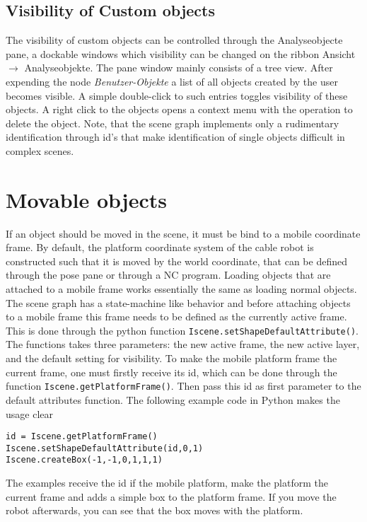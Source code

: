 \documentclass[11pt,a4paper,onepage,openany]{book}
\begin{document}
\subsection{Visibility of Custom objects}
The visibility of custom objects can be controlled through the Analyseobjecte
pane, a dockable windows which visibility can be changed on the ribbon
Ansicht $\rightarrow$ Analyseobjekte. The pane window mainly consists of a
tree view. After expending the node \emph{Benutzer-Objekte} a list of all
objects created by the user becomes visible. A simple double-click to such
entries toggles visibility of these objects. A right click to the objects
opens a context menu with the operation to delete the object. Note, that the
scene graph implements only a rudimentary identification through id's that
make identification of single objects difficult in complex scenes.

\section{Movable objects}
If an object should be moved in the scene, it must be bind to a mobile
coordinate frame. By default, the platform coordinate system of the cable robot
is constructed such that it is moved by the world coordinate, that can be
defined through the pose pane or through a NC program. Loading objects that are
attached to a mobile frame works essentially the same as loading normal
objects. The scene graph has a state-machine like behavior and before attaching
objects to a mobile frame this frame needs to be defined as the currently
active frame. This is done through the python function
\texttt{Iscene.setShapeDefaultAttribute()}. The functions takes three
parameters: the new active frame, the new active layer, and the default setting
for visibility. To make the mobile platform frame the current frame, one must
firstly receive its id, which can be done through the function
\texttt{Iscene.getPlatformFrame()}. Then pass this id as first parameter to the
default attributes function. The following example code in Python makes the
usage clear
\begin{verbatim}
id = Iscene.getPlatformFrame()
Iscene.setShapeDefaultAttribute(id,0,1)
Iscene.createBox(-1,-1,0,1,1,1)
\end{verbatim}
The examples receive the id if the mobile platform, make the platform the
current frame and adds a simple box to the platform frame. If you move the
robot afterwards, you can see that the box moves with the platform.
\end{document}
